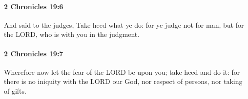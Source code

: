 		\paragraph{2 Chronicles 19:6} %
			\label{2CHRONICLES-19-6}

			And said to the judges, Take heed what ye do: for ye judge not for man, but for the LORD, who is with you in the judgment.


		\paragraph{2 Chronicles 19:7} %
			\label{2CHRONICLES-19-7}

			Wherefore now let the fear of the LORD be upon you; take heed and do it: for there is no iniquity with the LORD our God, nor respect of persons, nor taking of gifts.


